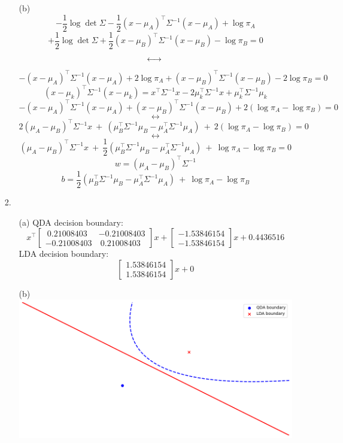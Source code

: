 \documentclass[12pt]{article}
\begin{document}
\begin{itemize}
\begin{itemize}
\item[(b)] 
\[
-\frac{1}{2} \log{\det{\Sigma}} - \frac{1}{2} (x-\mu_A)^\intercal \Sigma^{-1} (x-\mu_A) + \log \pi_A
\]
\[ 
+\frac{1}{2} \log{\det{\Sigma}} + \frac{1}{2} (x-\mu_B)^\intercal \Sigma^{-1} (x-\mu_B) - \log \pi_B = 0
\]
$$\longleftrightarrow\\$$
\[
 -(x-\mu_A)^\intercal \Sigma^{-1} (x-\mu_A) + 2\log \pi_A+(x-\mu_B)^\intercal \Sigma^{-1} (x-\mu_B) - 2\log \pi_B = 0
\]
\vspace{1cm}
\[
(x-\mu_k)^\intercal\Sigma^{-1}(x-\mu_k) = x^\intercal\Sigma^{-1}x-2\mu_k^\intercal\Sigma^{-1}x+\mu_k^\intercal\Sigma^{-1}\mu_k
\]
\vspace{1cm}
\[
 -(x-\mu_A)^\intercal \Sigma^{-1} (x-\mu_A)+(x-\mu_B)^\intercal \Sigma^{-1} (x-\mu_B) + 2(\log\pi_A - \log\pi_B) = 0
\]
$$\longleftrightarrow$$
\[
2(\mu_A-\mu_B)^\intercal\Sigma^{-1}x\ +\ (\mu_B^\intercal\Sigma^{-1}\mu_B - \mu_A^\intercal\Sigma^{-1}\mu_A)\ +\ 2(\log\pi_A -\log\pi_B) = 0
\]
$$\longleftrightarrow$$
\[
(\mu_A-\mu_B)^\intercal\Sigma^{-1}x\ +\ \frac{1}{2}(\mu_B^\intercal\Sigma^{-1}\mu_B - \mu_A^\intercal\Sigma^{-1}\mu_A)\ +\ \log\pi_A -\log\pi_B = 0
\]
\vspace{1cm}
\[w = (\mu_A-\mu_B)^\intercal\Sigma^{-1}\]
\[b = \frac{1}{2}(\mu_B^\intercal\Sigma^{-1}\mu_B - \mu_A^\intercal\Sigma^{-1}\mu_A)\ +\ \log\pi_A -\log\pi_B\]
\vspace{1cm} %
\end{itemize}
\item[2.] 
\begin{itemize}
\item[(a)] 
QDA decision boundary: \[
x^\intercal \begin{bmatrix}
\ 0.21008403 & -0.21008403 \\
-0.21008403 & \ 0.21008403
\end{bmatrix}x + \begin{bmatrix}
-1.53846154\\
-1.53846154
\end{bmatrix}x + 0.4436516
\]
\vspace{1cm}
LDA decision boundary: \[
\begin{bmatrix}
1.53846154\\
1.53846154
\end{bmatrix}x + 0
\]
\item[(b)]
\includegraphics[scale=0.4]{image.png}

\end{itemize}
\end{itemize}
\end{document}
